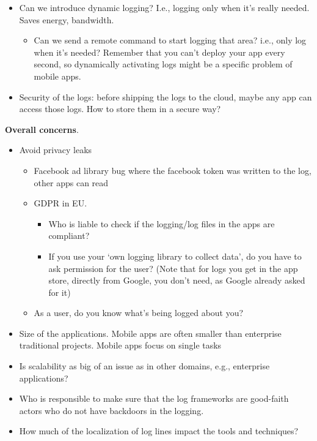\documentclass[a4paper]{article}
\newcommand{\smallsection}[1]{\noindent \textbf{#1}. }
\begin{document}
\begin{itemize}
\item
  Can we introduce dynamic logging? I.e., logging only when it's really
  needed. Saves energy, bandwidth.
    \begin{itemize}
    \tightlist
    \item Can we send a remote command to start logging that area? i.e., only log when it's needed? Remember that you can't deploy your app every second, so dynamically activating logs might be a specific problem of mobile apps.
    \end{itemize}
\item
  Security of the logs: before shipping the logs to the cloud, maybe any
  app can access those logs. How to store them in a secure way?
\end{itemize}

\smallsection{Overall concerns}
\begin{itemize}
\tightlist
\item
  Avoid privacy leaks
  \begin{itemize}
\item
  Facebook ad library bug where the facebook token was written to the
  log, other apps can read
\item
  GDPR in EU.

  \begin{itemize}
  \tightlist
  \item
    Who is liable to check if the logging/log files in the apps are
    compliant?
  \item
    If you use your `own logging library to collect data', do you have
    to ask permission for the user? (Note that for logs you get in the
    app store, directly from Google, you don't need, as Google already
    asked for it)
  \end{itemize}
\item
  As a user, do you know what's being logged about you?
  \end{itemize}
\item
  Size of the applications. Mobile apps are often smaller than
  enterprise traditional projects. Mobile apps focus on single tasks
\item
  Is scalability as big of an issue as in other domains, e.g.,
  enterprise applications?
\item
  Who is responsible to make sure that the log frameworks are good-faith
  actors who do not have backdoors in the logging.
\item
  How much of the localization of log lines impact the tools and
  techniques?
\end{itemize}
\end{document}
